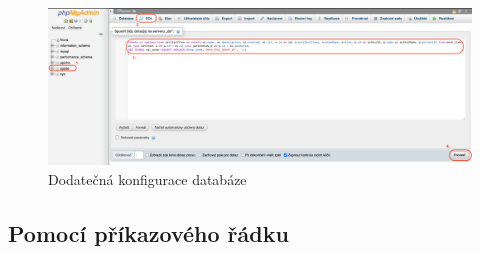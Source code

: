 \documentclass[czech,DP]{thesiskiv}
\begin{document}
\begin{enumerate}
\begin{figure}[!htb]
    \centering
    \includegraphics[width=400pt]{img/deploy_php_3.png}
    \caption{Dodatečná konfigurace databáze}    
    \label{img:deploy_php_3}
\end{figure}
\FloatBarrier
\end{enumerate}
\subsection{Pomocí příkazového řádku}
\end{document}
